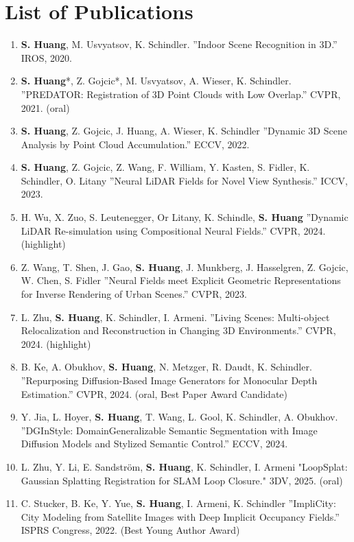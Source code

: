 
\chapter{List of Publications}
\label{chap:pub}

\begin{enumerate}
    \item \textbf{\textbf{S. Huang}}, M. Usvyatsov, K. Schindler. ”Indoor Scene Recognition in 3D.” IROS, 2020.
    \item \textbf{S. Huang}*, Z. Gojcic*, M. Usvyatsov, A. Wieser, K. Schindler. ”PREDATOR: Registration of 3D Point Clouds with Low Overlap.” CVPR, 2021. (oral)
    \item \textbf{S. Huang}, Z. Gojcic, J. Huang, A. Wieser, K. Schindler ”Dynamic 3D Scene Analysis by Point Cloud Accumulation.” ECCV, 2022.
    \item \textbf{S. Huang}, Z. Gojcic, Z. Wang, F. William, Y. Kasten, S. Fidler, K. Schindler, O. Litany ”Neural LiDAR Fields for Novel View Synthesis.” ICCV, 2023.
    \item H. Wu, X. Zuo, S. Leutenegger, Or Litany, K. Schindle, \textbf{S. Huang} ”Dynamic LiDAR Re-simulation using Compositional Neural Fields.” CVPR, 2024. (highlight)
    \item Z. Wang, T. Shen, J. Gao, \textbf{S. Huang}, J. Munkberg, J. Hasselgren, Z. Gojcic, W. Chen, S. Fidler ”Neural Fields meet Explicit Geometric Representations for Inverse Rendering of Urban Scenes.” CVPR, 2023.
    \item L. Zhu, \textbf{S. Huang}, K. Schindler, I. Armeni. ”Living Scenes: Multi-object Relocalization and Reconstruction in Changing 3D Environments.” CVPR, 2024. (highlight)
    \item B. Ke, A. Obukhov, \textbf{S. Huang}, N. Metzger, R. Daudt, K. Schindler. ”Repurposing Diﬀusion-Based Image Generators for Monocular Depth Estimation.” CVPR, 2024. (oral, Best Paper Award Candidate)
    \item Y. Jia, L. Hoyer, \textbf{S. Huang}, T. Wang, L. Gool, K. Schindler, A. Obukhov. ”DGInStyle: DomainGeneralizable Semantic Segmentation with Image Diﬀusion Models and Stylized Semantic Control.” ECCV, 2024.
    \item L. Zhu, Y. Li, E. Sandström, \textbf{S. Huang}, K. Schindler, I. Armeni "LoopSplat: Gaussian Splatting Registration for SLAM Loop Closure." 3DV, 2025. (oral)
    \item C. Stucker, B. Ke, Y. Yue, \textbf{S. Huang}, I. Armeni, K. Schindler ”ImpliCity: City Modeling from Satellite Images with Deep Implicit Occupancy Fields.” ISPRS Congress, 2022. (Best Young Author Award)

\end{enumerate}
